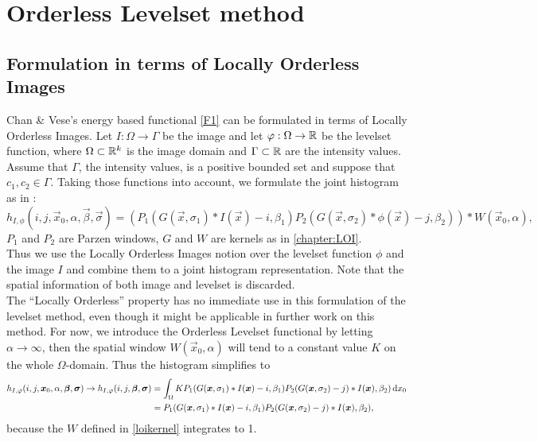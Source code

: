 
\chapter{Orderless Levelset method}\label{chapter:OL}

\section{Formulation in terms of Locally Orderless Images}\label{section:OLform}
Chan \& Vese's energy based functional \eqref{F1} can be formulated in terms of Locally Orderless Images. Let $I:\Omega\to \Gamma$ be the image and let $\varphi:\Omega\to\mathbb R$ be the levelset function, where $\Omega\subset \mathbb R^k$ is the image domain and $\Gamma\subset\mathbb R$ are the intensity values. Assume that $\Gamma$, the intensity values, is a positive bounded set and suppose that $c_1,c_2\in \Gamma$. Taking those functions into account, we formulate the joint histogram as in \cite{dar.11}:
\begin{equation}
  h_{I,\phi}(i,j,\vec{x}_0,\alpha,\vec{\beta},\vec{\sigma}) = (P_1(G(\vec{x},\sigma_1)*I(\vec{x})-i,\beta_1)P_2(G(\vec{x},\sigma_2)*\phi(\vec{x})-j,\beta_2))*W(\vec{x}_0,\alpha),
\end{equation}
$P_1$ and $P_2$ are Parzen windows, $G$ and $W$ are kernels as in \cref{chapter:LOI}.\\
Thus we use the Locally Orderless Images notion over the levelset function $\phi$ and the image $I$ and combine them to a joint histogram representation. Note that the spatial information of both image and levelset is discarded.\\
The ``Locally Orderless'' property has no immediate use in this formulation of the levelset method, even though it might be applicable in further work on this method. For now, we introduce the Orderless Levelset functional by letting $\alpha\to \infty$, then the spatial window $W(\vec{x}_0,\alpha)$ will tend to a constant value $K$ on the whole $\Omega$-domain. Thus the histogram simplifies to
\begin{equation}
  \begin{split}
    h_{I,\varphi}(i,j,\boldsymbol{x} _0,\alpha,\boldsymbol{\beta} ,\boldsymbol{\sigma} )\to h_{I,\varphi}(i,j,\boldsymbol{\beta} ,\boldsymbol{\sigma} ) &= \int _\Omega KP_1(G(\boldsymbol{x} ,\sigma_1)*I(\boldsymbol{x} )-i,\beta_1)P_2(G(\boldsymbol{x} ,\sigma_2)-j)*I(\boldsymbol{x} ),\beta_2)\,{\rm d} x_0\\
    &= P_1(G(\boldsymbol{x} ,\sigma_1)*I(\boldsymbol{x} )-i,\beta_1)P_2(G(\boldsymbol{x} ,\sigma_2)-j)*I(\boldsymbol{x} ),\beta_2),
  \end{split}
\end{equation}
because the $W$ defined in \eqref{loikernel} integrates to 1.\\

